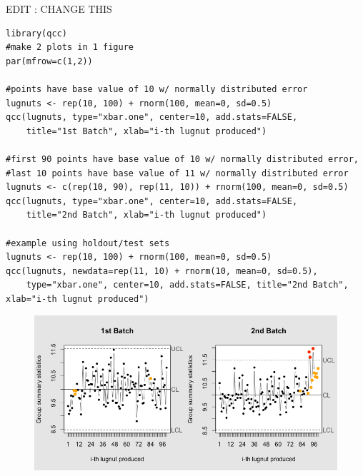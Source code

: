 \documentclass[a4paper,12pt]{article}
\begin{document}
EDIT : CHANGE THIS
\begin{framed}
\begin{verbatim}
library(qcc)
#make 2 plots in 1 figure
par(mfrow=c(1,2))
 
#points have base value of 10 w/ normally distributed error
lugnuts <- rep(10, 100) + rnorm(100, mean=0, sd=0.5)
qcc(lugnuts, type="xbar.one", center=10, add.stats=FALSE,
    title="1st Batch", xlab="i-th lugnut produced")
 
#first 90 points have base value of 10 w/ normally distributed error,
#last 10 points have base value of 11 w/ normally distributed error
lugnuts <- c(rep(10, 90), rep(11, 10)) + rnorm(100, mean=0, sd=0.5)
qcc(lugnuts, type="xbar.one", center=10, add.stats=FALSE,
    title="2nd Batch", xlab="i-th lugnut produced")
 
#example using holdout/test sets
lugnuts <- rep(10, 100) + rnorm(100, mean=0, sd=0.5)
qcc(lugnuts, newdata=rep(11, 10) + rnorm(10, mean=0, sd=0.5),
    type="xbar.one", center=10, add.stats=FALSE, title="2nd Batch", xlab="i-th lugnut produced")
\end{verbatim}
\end{framed}



\begin{figure}[h!]
\centering
\includegraphics[width=0.7\linewidth]{./sqcr2}
\caption{}
\label{fig:sqcr2}
\end{figure}
\newpage
\end{document}

